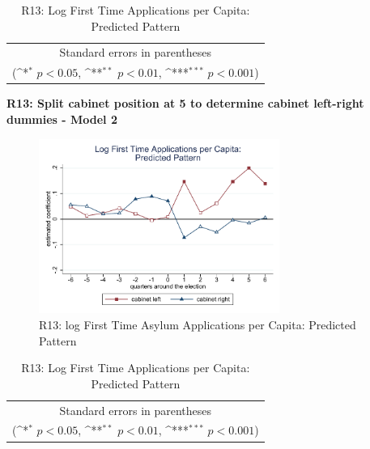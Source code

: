 \documentclass[10pt,a4paper]{scrartcl}
\begin{document}
\begin{table}[!ht]\centering
	\renewcommand{\arraystretch}{1.25}
	\def\sym#1{\ifmmode^{#1}\else\(^{#1}\)\fi}
	\caption{R13: Log First Time Applications per Capita: Predicted Pattern}
	\begin{tabular}{l*{2}{c}}
		\hline\hline
		
		\hline\hline
		\multicolumn{3}{c}{\footnotesize Standard errors in parentheses} \\
		\multicolumn{3}{c}{\footnotesize (\sym{*} \(p<0.05\), \sym{**} \(p<0.01\), \sym{***} \(p<0.001\))}\\
	\end{tabular}
\end{table}

\clearpage
\textbf{R13: Split cabinet position at 5 to determine cabinet left-right dummies - Model 2}
\begin{figure}[!ht]
	\centering
	\includegraphics[width=0.7\textwidth]{figures_edited/app_graph2_R13.pdf}
	\caption{R13: log First Time Asylum Applications per Capita: Predicted Pattern}
\end{figure}

\begin{table}[!ht]\centering
	\footnotesize
	\renewcommand{\arraystretch}{1.2}
	\def\sym#1{\ifmmode^{#1}\else\(^{#1}\)\fi}
	\caption{R13: Log First Time Applications per Capita: Predicted Pattern}
	\begin{tabular}{l*{2}{c}}
		\hline\hline
		
		\hline\hline
		\multicolumn{3}{c}{\footnotesize Standard errors in parentheses} \\
		\multicolumn{3}{c}{\footnotesize (\sym{*} \(p<0.05\), \sym{**} \(p<0.01\), \sym{***} \(p<0.001\))} \\
	\end{tabular}
\end{table}
\end{document}
